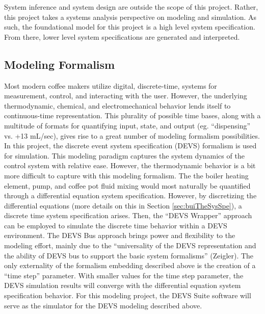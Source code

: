 \documentclass[10pt]{article}
\begin{document}
System inference and system design are outside the scope of this project.  Rather, this project takes a systems analysis perspective on modeling and simulation.  As such, the foundational model for this project is a high level system specification.  From there, lower level system specifications are generated and interpreted.


\subsection{Modeling Formalism}
\label{sec:modPar}
Most modern coffee makers utilize digital, discrete-time, systems for measurement, control, and interacting with the user.  However, the underlying thermodynamic, chemical, and electromechanical behavior lends itself to continuous-time representation.  This plurality of possible time bases, along with a multitude of formats for quantifying input, state, and output (eg. ``dispensing'' vs. +13 mL/sec), gives rise to a great number of modeling formalism possibilities.  In this project, the discrete event system specification (DEVS) formalism is used for simulation.  This modeling paradigm captures the system dynamics of the control system with relative ease.  However, the thermodynamic behavior is a bit more difficult to capture with this modeling formalism.  The the boiler heating element, pump, and coffee pot fluid mixing would most naturally be quantified through a differential equation system specification.  However, by discretizing the differential equations (more details on this in Section \ref{sec:buiTheSysSpe}), a discrete time system specification arises.  Then, the ``DEVS Wrapper'' approach can be employed to simulate the discrete time behavior within a DEVS environment.  The DEVS Bus approach brings power and flexibility to the modeling effort, mainly due to the ``universality of the DEVS representation and the ability of DEVS bus to support the basic system formalisms'' (Zeigler).  The only externality of the formalism embedding described above is the creation of a ``time step'' parameter.  With smaller values for the time step parameter, the DEVS simulation results will converge with the differential equation system specification behavior.  For this modeling project, the DEVS Suite software will serve as the simulator for the DEVS modeling described above.
\end{document}
